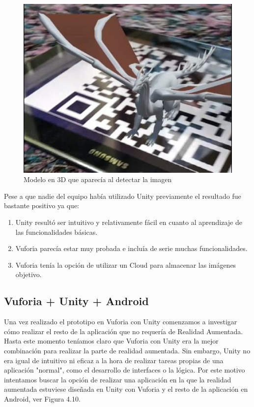     \begin{figure}[H]
        \centering
        \includegraphics[width=5in]{figures/prototipoUnity.jpg}
        \caption{Modelo en 3D que aparecía al detectar la imagen}
    \end{figure}
\begin{flushleft}
    Pese a que nadie del equipo había utilizado Unity previamente el resultado fue bastante positivo ya que:
    \begin{enumerate}
    \item Unity resultó ser intuitivo y relativamente fácil en cuanto al aprendizaje de las funcionalidades básicas.
    \item Vuforia parecía estar muy probada e incluía de serie muchas funcionalidades.
    \item Vuforia tenía la opción de utilizar un Cloud para almacenar las imágenes objetivo.
    \end{enumerate}
\end{flushleft}

\subsection{Vuforia + Unity + Android} 
\label{makereference3.6.5}

Una vez realizado el prototipo en Vuforia con Unity comenzamos a investigar cómo realizar el resto de la aplicación que no requería de Realidad Aumentada.
Hasta este momento teníamos claro que Vuforia con Unity era la mejor combinación para realizar la parte de realidad aumentada. Sin embargo, Unity no era igual de intuitivo ni eficaz a la hora de realizar tareas propias de una aplicación "normal", como el desarrollo de interfaces o la lógica.
Por este motivo intentamos buscar la opción de realizar una aplicación en la que la realidad aumentada estuviese diseñada en Unity con Vuforia y el resto de la aplicación en Android, ver Figura 4.10.

